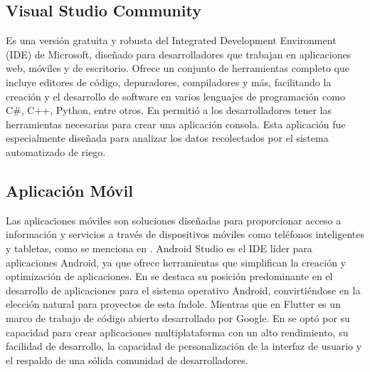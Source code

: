 \subsection{Visual Studio Community}
Es una versión gratuita y robusta del Integrated Development Environment (IDE) de Microsoft, diseñado para desarrolladores que trabajan en aplicaciones web, móviles y de escritorio. Ofrece un conjunto de herramientas completo que incluye editores de código, depuradores, compiladores y más, facilitando la creación y el desarrollo de software en varios lenguajes de programación como C\#, C++, Python, entre otros. En \cite{alcivar_dominguez_sistema_2018} permitió a los desarrolladores tener las herramientas necesarias para crear una aplicación consola. Esta aplicación fue especialmente diseñada para analizar los datos recolectados por el sistema automatizado de riego.

\subsection{Aplicación Móvil}
Las aplicaciones móviles son soluciones diseñadas para proporcionar acceso a información y servicios a través de dispositivos móviles como teléfonos inteligentes y tabletas, como se menciona en \cite{noauthor_fuzzy_2023}. Android Studio es el IDE líder para aplicaciones Android, ya que ofrece herramientas que simplifican la creación y optimización de aplicaciones. En \cite{castillo_herrero_desarrollo_2020} se destaca su posición predominante en el desarrollo de aplicaciones para el sistema operativo Android, convirtiéndose en la elección natural para proyectos de esta índole. Mientras que en Flutter es un marco de trabajo de código abierto desarrollado por Google. En \cite{ramos_galindo_diseno_2023} se optó por su capacidad para crear aplicaciones multiplataforma con un alto rendimiento, su facilidad de desarrollo, la capacidad de personalización de la interfaz de usuario y el respaldo de una sólida comunidad de desarrolladores.


